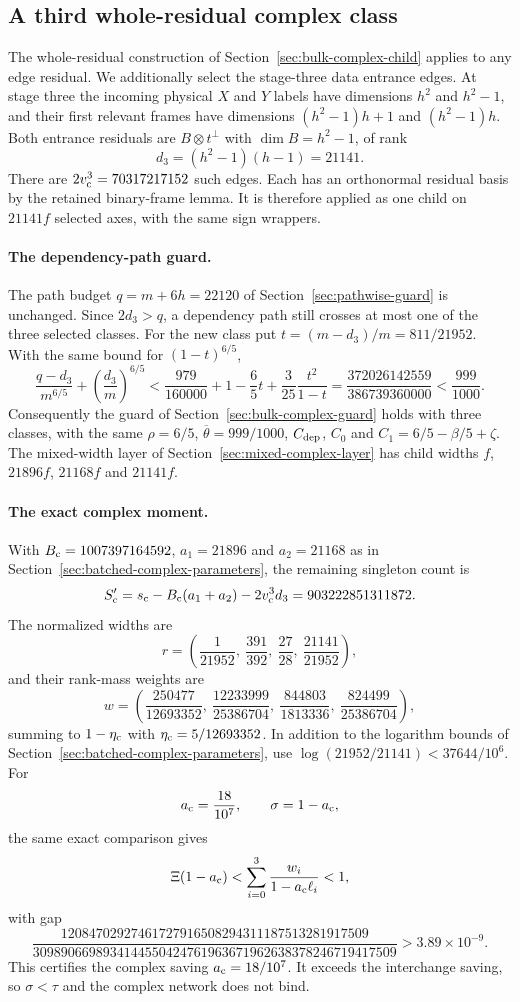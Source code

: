 \subsection{A third whole-residual complex class}
\label{sec:source-frame-complex}

The whole-residual construction of Section~\ref{sec:bulk-complex-child}
applies to any edge residual. We additionally select the stage-three data
entrance edges. At stage three the incoming physical $X$ and $Y$ labels
have dimensions $h^2$ and $h^2-1$, and their first relevant frames have
dimensions $(h^2-1)h+1$ and $(h^2-1)h$. Both entrance residuals are
$B\otimes t^\perp$ with $\dim B=h^2-1$, of rank
\[
 d_3=(h^2-1)(h-1)=21141.
\]
There are $2v_{\rm c}^3=70317217152$ such edges. Each has an orthonormal
residual basis by the retained binary-frame lemma. It is therefore applied
as one child on $21141f$ selected axes, with the same sign wrappers.

\paragraph{The dependency-path guard.}
The path budget $q=m+6h=22120$ of
Section~\ref{sec:pathwise-guard} is unchanged. Since $2d_3>q$, a dependency
path still crosses at most one of the three selected classes. For the new
class put $t=(m-d_3)/m=811/21952$. With the same bound for $(1-t)^{6/5}$,
\[
 \frac{q-d_3}{m^{6/5}}+\left(\frac{d_3}m\right)^{6/5}
 <\frac{979}{160000}+1-\frac65t+\frac3{25}\frac{t^2}{1-t}
 =\frac{372026142559}{386739360000}<\frac{999}{1000}.
\]
Consequently the guard of Section~\ref{sec:bulk-complex-guard} holds with
three classes, with the same $\rho=6/5$, $\overline\theta=999/1000$,
$C_{\rm dep}$, $C_0$ and $C_1=6/5-\beta/5+\zeta$. The mixed-width layer of
Section~\ref{sec:mixed-complex-layer} has child widths $f$, $21896f$,
$21168f$ and $21141f$.

\paragraph{The exact complex moment.}
With $B_{\rm c}=1007397164592$, $a_1=21896$ and $a_2=21168$ as in
Section~\ref{sec:batched-complex-parameters}, the remaining singleton
count is
\[
 S_{\rm c}'=s_{\rm c}-B_{\rm c}(a_1+a_2)-2v_{\rm c}^3d_3
 =903222851311872.
\]
The normalized widths are
\[
 r=\left(\frac1{21952},\ \frac{391}{392},\ \frac{27}{28},\
       \frac{21141}{21952}\right),
\]
and their rank-mass weights are
\[
 w=\left(\frac{250477}{12693352},\ \frac{12233999}{25386704},\
       \frac{844803}{1813336},\ \frac{824499}{25386704}\right),
\]
summing to $1-\eta_{\rm c}$ with $\eta_{\rm c}=5/12693352$. In addition to
the logarithm bounds of Section~\ref{sec:batched-complex-parameters}, use
$\log(21952/21141)<37644/10^6$. For
\[
 a_{\rm c}=\frac{18}{10^7},\qquad \sigma=1-a_{\rm c},
\]
the same exact comparison gives
\[
 \Xi(1-a_{\rm c})<\sum_{i=0}^3\frac{w_i}{1-a_{\rm c}\ell_i}<1,
\]
with gap
\[
 \frac{12084702927461727916508294311187513281917509}
      {3098906698934144550424761963671962638378246719417509}
 >3.89\times10^{-9}.
\]
This certifies the complex saving $a_{\rm c}=18/10^7$. It exceeds the
interchange saving, so $\sigma<\tau$ and the complex network does not bind.
